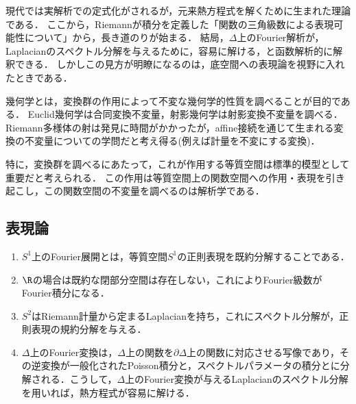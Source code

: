 \documentclass[uplatex,dvipdfmx]{jsreport}
\begin{document}
\begin{history}
    現代では実解析での定式化がされるが，元来熱方程式を解くために生まれた理論である．
    ここから，Riemannが積分を定義した「関数の三角級数による表現可能性について」から，長き道のりが始まる．
    結局，$\Delta$上のFourier解析が，Laplacianのスペクトル分解を与えるために，容易に解ける，と函数解析的に解釈できる．
    しかしこの見方が明瞭になるのは，底空間への表現論を視野に入れたときである．
\end{history}

\begin{history}
    幾何学とは，変換群の作用によって不変な幾何学的性質を調べることが目的である．
    Euclid幾何学は合同変換不変量，射影幾何学は射影変換不変量を調べる．
    Riemann多様体の射は発見に時間がかかったが，affine接続を通じて生まれる変換の不変量についての学問だと考え得る(例えば計量を不変にする変換)．

    特に，変換群を調べるにあたって，これが作用する等質空間は標準的模型として重要だと考えられる．
    この作用は等質空間上の関数空間への作用・表現を引き起こし，この関数空間の不変量を調べるのは解析学である．
\end{history}

\subsection{表現論}

\begin{tcolorbox}[colframe=ForestGreen, colback=ForestGreen!10!white,breakable,colbacktitle=ForestGreen!40!white,coltitle=black,fonttitle=\bfseries\sffamily,
title=]
    \begin{enumerate}
        \item $S^1$上のFourier展開とは，等質空間$S^1$の正則表現を既約分解することである．
        \item $\R$の場合は既約な閉部分空間は存在しない，これによりFourier級数がFourier積分になる．
        \item $S^2$はRiemann計量から定まるLaplacianを持ち，これにスペクトル分解が，正則表現の規約分解を与える．
        \item $\Delta$上のFourier変換は，$\Delta$上の関数を$\partial\Delta$上の関数に対応させる写像であり，その逆変換が一般化されたPoisson積分と，スペクトルパラメータの積分とに分解される．こうして，$\Delta$上のFourier変換が与えるLaplacianのスペクトル分解を用いれば，熱方程式が容易に解ける．
    \end{enumerate}
\end{tcolorbox}
\end{document}
